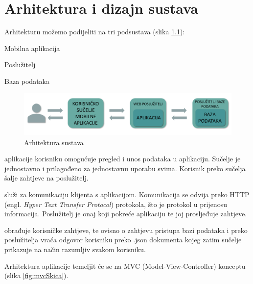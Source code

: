 \chapter{Arhitektura i dizajn sustava}
		
		
		Arhitekturu možemo podijeliti na tri podsustava (slika \ref{fig:arhitekturaSkica}):

		\begin{packed_item}
			\item  Mobilna aplikacija
			\item  Poslužitelj
			\item  Baza podataka
		\end{packed_item}

		\begin{figure}[H]
			\includegraphics[scale=0.63]{slike/arhitektura.PNG} %
			\centering
			\caption{Arhitektura sustava}
			\label{fig:arhitekturaSkica}
		\end{figure}
	
		\textit{} aplikacije korisniku omogućuje pregled i unos podataka u aplikaciju. Sučelje je jednostavno i prilagođeno za jednostavnu uporabu svima. Korisnik preko sučelja šalje zahtjeve na poslužitelj.

		\textit{} služi za komunikaciju klijenta s aplikacijom. Komunikacija se odvija preko HTTP (engl. \textit{Hyper Text Transfer Protocol}) protokola, što je protokol u prijenosu informacija. Poslužitelj je onaj koji pokreće aplikaciju te joj prosljeđuje zahtjeve.

		\textit{} obrađuje korisničke zahtjeve, te ovisno o zahtjevu pristupa bazi podataka i preko poslužitelja vraća odgovor korisniku preko .json dokumenta kojeg zatim sučelje prikazuje na način razumljiv svakom korisniku.

		Arhitektura aplikacije temeljit će se na MVC (Model-View-Controller) konceptu (slika \ref{fig:mvcSkica}).

